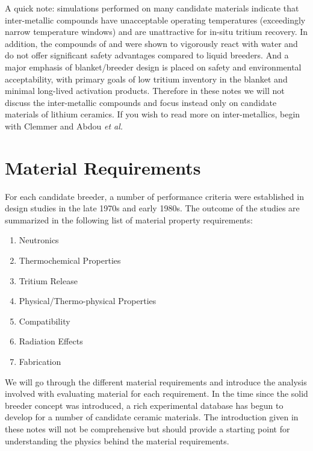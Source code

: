 \documentclass[11pt]{report} %
\begin{document}
A quick note: simulations performed on many candidate materials indicate that inter-metallic compounds have unacceptable operating temperatures (exceedingly narrow temperature windows) and are unattractive for in-situ tritium recovery. In addition, the compounds of  and  were shown to vigorously react with water and do not offer significant safety advantages compared to liquid breeders. And a major emphasis of blanket/breeder design is placed on safety and environmental acceptability, with primary goals of low tritium inventory in the blanket and minimal long-lived activation products. Therefore in these notes we will not discuss the inter-metallic compounds and focus instead only on candidate materials of lithium ceramics. If you wish to read more on inter-metallics, begin with Clemmer\cite{Clemmer1980} and Abdou \textit{et al.}



\section{Material Requirements}
For each candidate breeder, a number of performance criteria were established in design studies in the late 1970s and early 1980s. The outcome of the studies are summarized in the following list of material property requirements:
\begin{enumerate}
\item Neutronics
\item Thermochemical Properties
\item Tritium Release
\item Physical/Thermo-physical Properties
\item Compatibility
\item Radiation Effects
\item Fabrication
\end{enumerate}

We will go through the different material requirements and introduce the analysis involved with evaluating material for each requirement. In the time since the solid breeder concept was introduced, a rich experimental database has begun to develop for a number of candidate ceramic materials. The introduction given in these notes will not be comprehensive but should provide a starting point for understanding the physics behind the material requirements.
\end{document}

